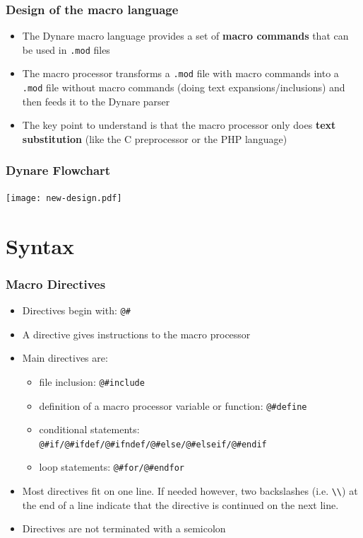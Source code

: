 \documentclass[aspectratio=169]{beamer}
\begin{document}
\begin{frame}
  \frametitle{Design of the macro language}
  \begin{itemize}
  \item The Dynare macro language provides a set of \textbf{macro commands} that can be used in \texttt{.mod} files
  \item The macro processor transforms a \texttt{.mod} file with macro commands into a \texttt{.mod} file without macro commands (doing text expansions/inclusions) and then feeds it to the Dynare parser
  \item The key point to understand is that the macro processor only does \textbf{text substitution} (like the C preprocessor or the PHP language)
  \end{itemize}
\end{frame}

\begin{frame}
  \frametitle{Dynare Flowchart}
  \texttt{[image: new-design.pdf]}
\end{frame}

\section{Syntax}

\begin{frame}[fragile=singleslide]
  \frametitle{Macro Directives}
  \begin{itemize}
  \item Directives begin with: \verb+@#+
  \item A directive gives instructions to the macro processor
  \item Main directives are:
    \begin{itemize}
    \item file inclusion: \verb+@#include+
    \item definition of a macro processor variable or function: \verb+@#define+
    \item conditional statements: \verb+@#if/@#ifdef/@#ifndef/@#else/@#elseif/@#endif+
    \item loop statements: \verb+@#for/@#endfor+
    \end{itemize}
  \item Most directives fit on one line. If needed however, two backslashes (i.e. \verb+\\+) at the end of a line indicate that the directive is continued on the next line.
  \item Directives are not terminated with a semicolon
  \end{itemize}
\end{frame}
\end{document}

